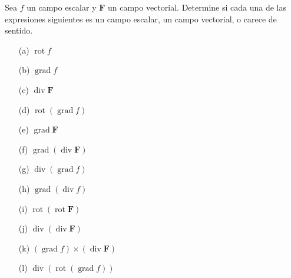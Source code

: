 \item Sea $f$ un campo escalar y $\mathbf{F}$ un campo vectorial. Determine si cada una de las expresiones siguientes es un campo escalar, un campo vectorial, o carece de sentido.
    \begin{enumerate}
        \item[(a)] $\operatorname{rot} f$
        \item[(b)] $\operatorname{grad} f$
        \item[(c)] $\operatorname{div} \mathbf{F}$
        \item[(d)] $\operatorname{rot}(\operatorname{grad} f)$
        \item[(e)] $\operatorname{grad} \mathbf{F}$
        \item[(f)] $\operatorname{grad}(\operatorname{div} \mathbf{F})$
        \item[(g)] $\operatorname{div}(\operatorname{grad} f)$
        \item[(h)] $\operatorname{grad}(\operatorname{div} f)$
        \item[(i)] $\operatorname{rot}(\operatorname{rot} \mathbf{F})$
        \item[(j)] $\operatorname{div}(\operatorname{div} \mathbf{F})$
        \item[(k)] $(\operatorname{grad} f) \times (\operatorname{div} \mathbf{F})$
        \item[(l)] $\operatorname{div}(\operatorname{rot}(\operatorname{grad} f))$
    \end{enumerate}

